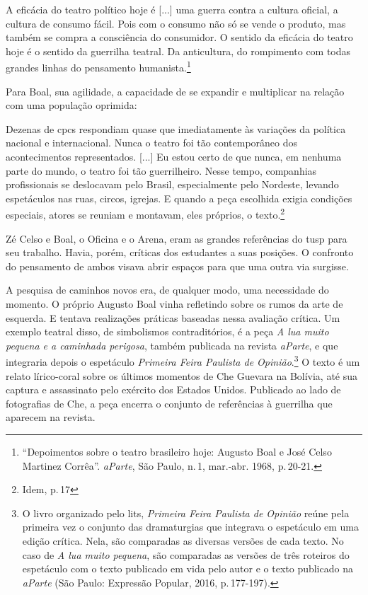 \startblockquote
A eficácia do teatro político hoje é {[}...{]} uma guerra contra a
cultura oficial, a cultura de consumo fácil. Pois com o consumo não só
se vende o produto, mas também se compra a consciência do consumidor. O
sentido da eficácia do teatro hoje é o sentido da guerrilha teatral. Da
anticultura, do rompimento com todas grandes linhas do pensamento
humanista.\footnote{“Depoimentos sobre o teatro brasileiro hoje: Augusto
  Boal e José Celso Martinez Corrêa”. {\it aParte}, São Paulo, n.\,1,
  mar.-abr. 1968, p.\,20-21.}
\stopblockquote

Para Boal, sua agilidade, a capacidade de se expandir e multiplicar na
relação com uma população oprimida:

\startblockquote
Dezenas de {\sc cpc}s respondiam quase que imediatamente às variações da
política nacional e internacional. Nunca o teatro foi tão contemporâneo
dos acontecimentos representados. {[}...{]} Eu estou certo de que nunca,
em nenhuma parte do mundo, o teatro foi tão guerrilheiro. Nesse tempo,
companhias profissionais se deslocavam pelo Brasil, especialmente pelo
Nordeste, levando espetáculos nas ruas, circos, igrejas. E quando a peça
escolhida exigia condições especiais, atores se reuniam e montavam, eles
próprios, o texto.\footnote{Idem, p.\,17}
\stopblockquote

Zé Celso e Boal, o Oficina e o Arena, eram as grandes referências do
{\sc tusp} para seu trabalho. Havia, porém, críticas dos estudantes a suas
posições. O confronto do pensamento de ambos visava abrir espaços para
que uma outra via surgisse.

A pesquisa de caminhos novos era, de qualquer modo, uma necessidade do
momento. O próprio Augusto Boal vinha refletindo sobre os rumos da arte
de esquerda. E tentava realizações práticas baseadas nessa avaliação
crítica. Um exemplo teatral disso, de simbolismos contraditórios, é a
peça {\it A lua muito pequena e a caminhada perigosa}, também publicada
na revista {\it aParte}, e que integraria depois o espetáculo
{\it Primeira Feira Paulista de Opinião}.\footnote{O livro organizado
  pelo {\sc lits}, {\it Primeira Feira Paulista de Opinião} reúne pela
  primeira vez o conjunto das dramaturgias que integrava o espetáculo em
  uma edição crítica. Nela, são comparadas as diversas versões de cada
  texto. No caso de {\it A lua muito pequena}, são comparadas as versões
  de três roteiros do espetáculo com o texto publicado em vida pelo
  autor e o texto publicado na {\it aParte} (São Paulo: Expressão
  Popular, 2016, p.\,177-197).} O texto é um relato lírico-coral sobre os
últimos momentos de Che Guevara na Bolívia, até sua captura e
assassinato pelo exército dos Estados Unidos. Publicado ao lado de
fotografias de Che, a peça encerra o conjunto de referências à guerrilha
que aparecem na revista.

